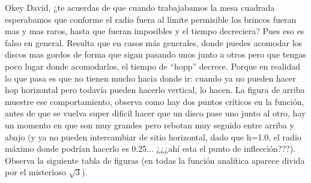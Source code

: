 \documentclass[letterpaper,10pt, jcp, aps]{revtex4-1}
\begin{document}
Okey David, ¿te acuerdas de que cuando trabajabamos la mesa cuadrada
esperabamos que conforme el radio fuera al límite permisible los brincos fueran
mas y mas raros, hasta que fueran imposibles y el tiempo decreciera?
Pues eso es falso en general. Resulta que en casos más generales, donde puedes acomodar los discos mas gordos de forma que sigan pasando unos junto a otros pero que tengas poco
lugar donde acomodarlos, el tiempo de ``hopp'' decrece. Porque en realidad
lo que pasa es que no tienen mucho hacia donde ir: cuando ya no pueden hacer hop horizontal pero todavía pueden hacerlo vertical, lo hacen. La figura de arriba muestre ese comportamiento, observa como hay dos puntos críticos en la función, antes de que se vuelva
super dificil hacer que un disco pase uno junto al otro, hay un momento en que son muy grandes pero rebotan muy seguido entre arriba y abajo (y ya no pueden intercambiar de sitio horizontal, dado que h=1.0, el radio máximo donde podrían hacerlo es 0.25... ¿¿¿ahí esta
el punto de inflección???). Observa la siguiente tabla de figuras (en todas la
función analítica aparece divida por el misterioso $\sqrt{3}$). 
\end{document}
